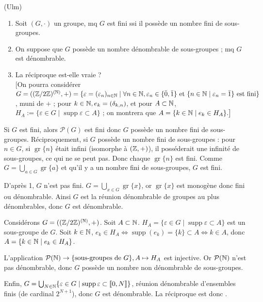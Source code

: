 
\begin{statementbox}
(Ulm)
\begin{enumerate}
  \item Soit $(G,\cdot)$ un groupe, mq $G$ est fini ssi il possède un nombre fini de sous-groupes.
  \item On suppose que $G$ possède un nombre dénombrable de sous-groupes ; mq $G$ est dénombrable.
  \item La réciproque est-elle vraie ? \\
  $\big[$On pourra considérer $G = ((\mathbb Z/2\mathbb Z)^{(\mathbb N)}, +) = \{\varepsilon = (\varepsilon_n)_{n \in \mathbb N} \mid \forall n \in \mathbb N, \varepsilon_n \in \{\bar{0}, \bar{1}\} \text{ et } \{n \in \mathbb N \mid \varepsilon_n = \bar{1}\} \text{ est fini}\}$, muni de $+$ ; pour $k \in \mathbb N, e_k = (\delta_{k,n})$, et pour $A \subset \mathbb N$, $H_A := \{\varepsilon \in G \mid \operatorname{supp} \varepsilon \subset A\}$ ; on montrera que $A = \{k \in \mathbb N \mid e_k \in H_A\}.\big]$
\end{enumerate}
\end{statementbox}

\begin{solution}
Si $G$ est fini, alors $\mathcal{P}(G)$ est fini donc $G$ possède un nombre fini de sous-groupes.
Réciproquement, si $G$ possède un nombre fini de sous-groupes : pour $n \in G$, si $\operatorname{gr}\{n\}$ était infini (isomorphe à $(\mathbb Z, +)$), il posséderait une infinité de sous-groupes, ce qui ne se peut pas. Donc chaque $\operatorname{gr}\{n\}$ est fini.
Comme $G = \bigcup_{a \in G} \operatorname{gr}\{a\}$ et qu'il y a un nombre fini de sous-groupes, $G$ est fini.

D'après 1, $G$ n'est pas fini. $G = \bigcup_{x \in G} \operatorname{gr}\{x\}$, or $\operatorname{gr}\{x\}$ est monogène donc fini ou dénombrable. Ainsi $G$ est la réunion dénombrable de groupes au plus dénombrables, donc $G$ est dénombrable.

Considérons $G = ((\mathbb Z/2\mathbb Z)^{(\mathbb N)}, +)$.
Soit $A \subset \mathbb N$. $H_A = \{\varepsilon \in G \mid \operatorname{supp}\varepsilon \subset A\}$ est un sous-groupe de $G$.
Soit $k \in \mathbb N$, $e_k \in H_A \iff \operatorname{supp}(e_k) = \{k\} \subset A \iff k \in A$, donc $A = \{k \in \mathbb N \mid e_k \in H_A\}$.

L'application $\mathcal{P}(\mathbb N) \to \{\text{sous-groupes de } G\}, A \mapsto H_A$ est injective.
Or $\mathcal{P}(\mathbb N)$ n'est pas dénombrable, donc $G$ possède un nombre non dénombrable de sous-groupes.

Enfin, $G = \bigcup_{N \in \mathbb N} \{\varepsilon \in G \mid \operatorname{supp} \varepsilon \subset \llbracket 0, N \rrbracket\}$, réunion dénombrable d'ensembles finis (de cardinal $2^{N+1}$), donc $G$ est dénombrable.
La réciproque est donc .
\end{solution}

